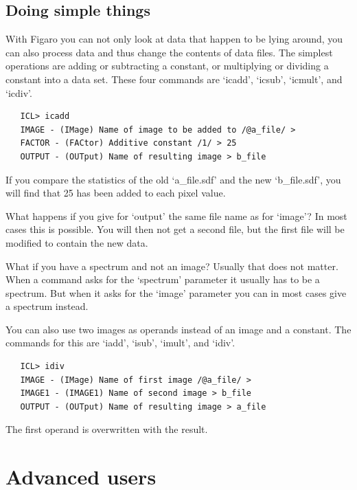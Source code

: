 \documentclass[11pt,twoside]{article}
\newcommand{\stardocinitials}  {SUN}
\newcommand{\stardocnumber}    {86.21}
\newcommand{\stardocname}{\stardocinitials /\stardocnumber}
\newcommand{\xlabel}[1]{}
\begin{document}

\subsection{\xlabel{arithm}\label{arithm}Doing simple things}

   With Figaro you can not only look at data that happen to be lying
   around, you can also process data and thus change the contents of
   data files. The simplest operations are adding or subtracting a
   constant, or multiplying or dividing a constant into a data set.
   These four commands are `icadd', `icsub', `icmult', and
   `icdiv'.

\begin{verbatim}
   ICL> icadd
   IMAGE - (IMage) Name of image to be added to /@a_file/ >
   FACTOR - (FACtor) Additive constant /1/ > 25
   OUTPUT - (OUTput) Name of resulting image > b_file
\end{verbatim}

   If you compare the statistics of the old `a\_file.sdf' and the new
   `b\_file.sdf', you will find that 25 has been added to each pixel
   value.

   What happens if you give for `output' the same file name as for
   `image'? In most cases this is possible. You will then not get a
   second file, but the first file will be modified to contain the new
   data.

   What if you have a spectrum and not an image? Usually that does not
   matter. When a command asks for the `spectrum' parameter it usually
   has to be a spectrum. But when it asks for the `image' parameter
   you can in most cases give a spectrum instead.

   You can also use two images as operands instead of an image and a
   constant. The commands for this are `iadd', `isub', `imult',
   and `idiv'.

\begin{verbatim}
   ICL> idiv
   IMAGE - (IMage) Name of first image /@a_file/ >
   IMAGE1 - (IMAGE1) Name of second image > b_file
   OUTPUT - (OUTput) Name of resulting image > a_file
\end{verbatim}

   The first operand is overwritten with the result.


\newpage %
\section{\xlabel{advanced}\label{advanced}Advanced users}
\markboth{Advanced users}{\stardocname}
\end{document}
